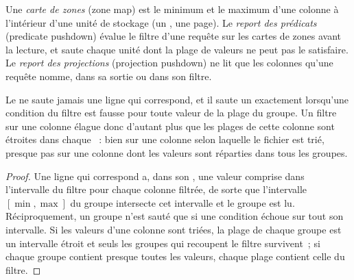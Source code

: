 \begin{definition}\label{def:pl:columnar-formats:pushdown}
Une \emph{carte de zones} (zone map) est le minimum et le maximum d'une colonne à l'intérieur d'une unité de stockage (un , une page).
Le \emph{report des prédicats} (predicate pushdown) évalue le filtre d'une requête sur les cartes de zones avant la lecture, et saute chaque
unité dont la plage de valeurs ne peut pas le satisfaire. Le \emph{report des projections} (projection pushdown) ne lit que les colonnes qu'une requête nomme,
dans sa sortie ou dans son filtre.
\end{definition}

\begin{proposition}\label{prop:pl:columnar-formats:pruning}
Le  ne saute jamais une ligne qui correspond, et il saute un  exactement lorsqu'une condition du filtre est fausse pour
toute valeur de la plage du groupe. Un filtre sur une colonne élague donc d'autant plus que les plages de cette colonne sont étroites dans
chaque ~: bien sur une colonne selon laquelle le fichier est trié, presque pas sur une colonne dont les valeurs sont réparties dans tous les groupes.
\end{proposition}

\begin{proof}
Une ligne qui correspond a, dans son , une valeur comprise dans l'intervalle du filtre pour chaque colonne filtrée, de sorte que l'intervalle
$[\min,\max]$ du groupe intersecte cet intervalle et le groupe est lu. Réciproquement, un groupe n'est sauté que si une condition échoue sur
tout son intervalle. Si les valeurs d'une colonne sont triées, la plage de chaque groupe est un intervalle étroit et seuls les groupes qui recoupent le
filtre survivent~; si chaque groupe contient presque toutes les valeurs, chaque plage contient celle du filtre.
\end{proof}

\label{lst:pl:columnar-formats:read}

